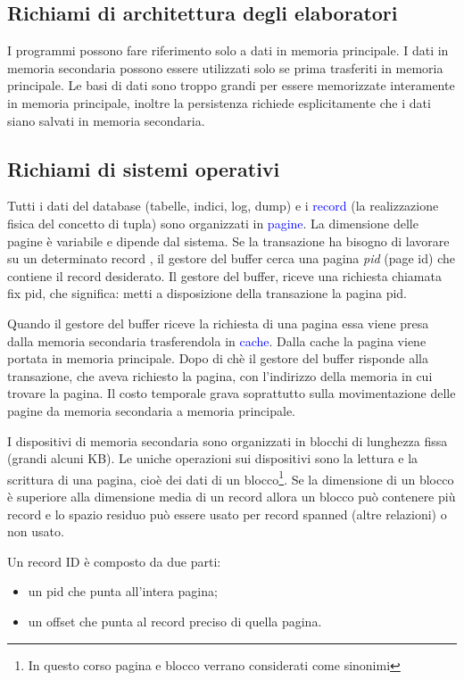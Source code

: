 \subsection{Richiami di architettura degli elaboratori}

I programmi possono fare riferimento solo a dati in memoria principale. I dati in memoria secondaria possono essere
utilizzati solo se prima trasferiti in memoria principale. Le basi di dati sono troppo grandi per essere memorizzate interamente in memoria principale, inoltre la persistenza richiede esplicitamente che i dati siano salvati in memoria secondaria. 

\subsection{Richiami di sistemi operativi}

Tutti i dati del database (tabelle, indici, log, dump) e i \textcolor{blue}{record} (la realizzazione fisica del concetto di tupla) sono organizzati in \textcolor{blue}{pagine}. La dimensione delle pagine è variabile e dipende dal sistema. Se la transazione ha bisogno di lavorare su un determinato record , il gestore del buffer cerca una pagina \textit{pid} (page id) che contiene il record desiderato. Il gestore del buffer, riceve una richiesta chiamata fix pid, che significa: metti a disposizione della transazione la pagina pid.

Quando il gestore del buffer riceve la richiesta di una pagina essa viene presa dalla memoria secondaria trasferendola in \textcolor{blue}{cache}. Dalla cache la pagina viene portata in memoria principale. Dopo di chè il gestore del buffer risponde alla transazione, che aveva richiesto la pagina, con l'indirizzo della memoria in cui trovare la pagina.
Il costo temporale grava soprattutto sulla movimentazione delle pagine da memoria secondaria a memoria principale.

I dispositivi di memoria secondaria sono organizzati in blocchi di lunghezza fissa (grandi alcuni KB). Le uniche operazioni sui dispositivi sono la lettura e la scrittura di una pagina, cioè dei dati di un blocco\footnote{In questo corso pagina e blocco verrano considerati come sinonimi}. Se la dimensione di un blocco è superiore alla dimensione media di un record allora un blocco può contenere più record e lo spazio residuo può essere usato per record spanned (altre relazioni) o non usato.

Un record ID è composto da due parti:
\begin{itemize}
    \item un pid che punta all'intera pagina;
    \item un offset che punta al record preciso di quella pagina.
\end{itemize}

